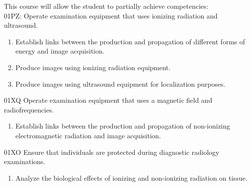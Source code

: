 {This course will allow the student to partially achieve competencies:\\

01PZ: Operate examination equipment that uses ionizing radiation and ultrasound.
\begin{enumerate}
\item Establish links between the production and propagation of different forms of energy and image acquisition.
\item Produce images using ionizing radiation equipment.
\item Produce images using ultrasound equipment for localization purposes.
\end{enumerate}
\bigskip
01XQ Operate examination equipment that uses a magnetic field and radiofrequencies.
\begin{enumerate}
\item Establish links between the production and propagation of non-ionizing electromagnetic radiation and image acquisition.
\end{enumerate}
\bigskip
01XO Ensure that individuals are protected during diagnostic radiology examinations.
\begin{enumerate}
\item Analyze the biological effects of ionizing and non-ionizing radiation on tissue.
\end{enumerate}
}
